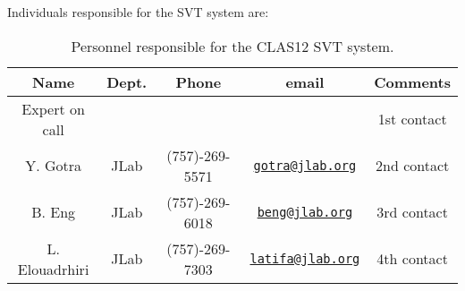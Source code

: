 Individuals responsible for the SVT system are:

\begin{table}[htbp]
\centering
\begin{tabular}{|c|c|c|c|c|} \hline
Name&Dept.&Phone&email&Comments \\ \hline
Expert on call& &&& 1st contact \\ \hline
Y. Gotra& JLab&(757)-269-5571&\href{mailto:gotra@jlab.org}{\nolinkurl{gotra@jlab.org}}&2nd contact \\ \hline
B. Eng&JLab&(757)-269-6018&\href{mailto:beng@jlab.org}{\nolinkurl{beng@jlab.org}}&3rd contact \\ \hline
L. Elouadrhiri&JLab&(757)-269-7303&\href{mailto:latifa@jlab.org}{\nolinkurl{latifa@jlab.org}}&4th contact \\ \hline
\end{tabular}
\caption{Personnel responsible for the CLAS12 SVT system.} 
\label{tb:svt}
\end{table}


